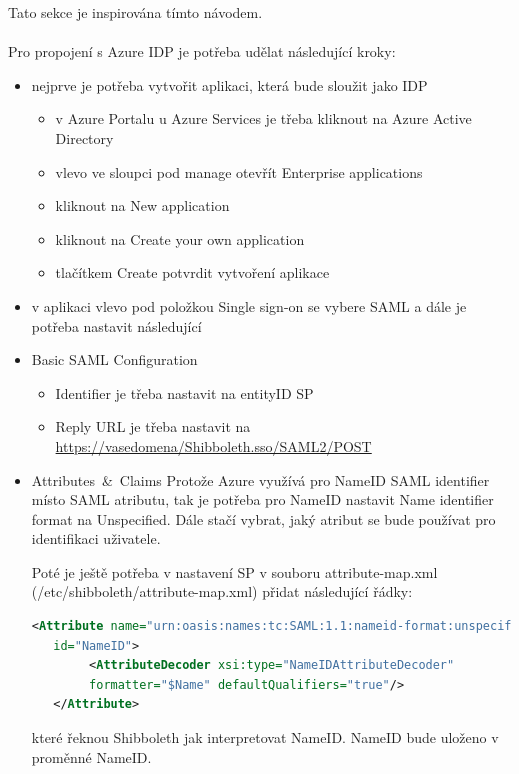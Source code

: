 Tato sekce je inspirována tímto návodem.\cite{AzureTutorial}
\\
\\
Pro propojení s Azure IDP je potřeba udělat následující kroky:
\begin{itemize}
    \item nejprve je potřeba vytvořit aplikaci, která bude sloužit jako IDP
    \begin{itemize}
    \item v Azure Portalu u Azure Services je třeba kliknout na Azure Active Directory
    \item vlevo ve sloupci pod manage otevřít Enterprise applications
    \item kliknout na New application
    \item kliknout na Create your own application
    \item tlačítkem Create potvrdit vytvoření aplikace
    \end{itemize}
    \item v aplikaci vlevo pod položkou Single sign-on se vybere SAML a dále je potřeba nastavit následující
    \item Basic SAML Configuration
    \begin{itemize}
        \item Identifier je třeba nastavit na entityID SP
        \item Reply URL je třeba nastavit na \url{https://vasedomena/Shibboleth.sso/SAML2/POST}
    \end{itemize}
    \item \mbox{Attributes \& Claims} \linebreak
    Protože Azure využívá pro NameID SAML identifier místo SAML atributu, tak je potřeba pro NameID nastavit Name identifier format na Unspecified.
    Dále stačí vybrat, jaký atribut se bude používat pro identifikaci uživatele.
    
    Poté je ještě potřeba v nastavení SP v souboru attribute-map.xml (/etc/shibboleth/attribute-map.xml) přidat následující řádky:
    
\begin{lstlisting}[language=XML]
   <Attribute name="urn:oasis:names:tc:SAML:1.1:nameid-format:unspecified"
   id="NameID">
        <AttributeDecoder xsi:type="NameIDAttributeDecoder" 
        formatter="$Name" defaultQualifiers="true"/>
   </Attribute>
\end{lstlisting}
které řeknou Shibboleth jak interpretovat NameID. NameID bude uloženo v proměnné NameID.


\end{itemize}
